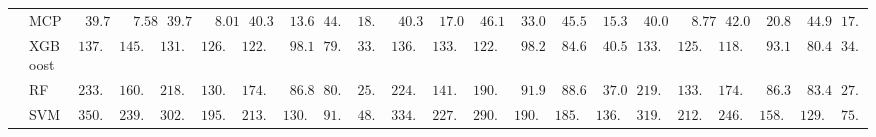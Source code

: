 \begin{tabular}{ll|ll|llllll|llllll|llllll}
 & MCP  & $\phantom{0}39.70$ & $\phantom{00}7.58$ & $\phantom{0}39.74$ & $\phantom{00}8.01$ & $\phantom{0}40.32$ & $\phantom{0}13.66$ & $44.95$ & $18.59$ & $\phantom{0}40.30$ & $\phantom{0}17.08$ & $\phantom{0}46.10$ & $\phantom{0}33.04$ & $\phantom{0}45.55$ & $\phantom{0}15.35$ & $\phantom{0}40.06$ & $\phantom{00}8.77$ & $\phantom{0}42.05$ & $\phantom{0}20.85$ & $\phantom{0}44.97$ & $17.36$ \\
 & XGBoost  & $137.63$ & $145.82$ & $131.73$ & $126.32$ & $122.86$ & $\phantom{0}98.16$ & $79.08$ & $33.90$ & $136.08$ & $133.86$ & $122.98$ & $\phantom{0}98.26$ & $\phantom{0}84.62$ & $\phantom{0}40.57$ & $133.47$ & $125.76$ & $118.80$ & $\phantom{0}93.19$ & $\phantom{0}80.47$ & $34.38$ \\
 & RF  & $233.18$ & $160.61$ & $218.74$ & $130.68$ & $174.17$ & $\phantom{0}86.89$ & $80.32$ & $25.93$ & $224.48$ & $141.31$ & $190.31$ & $\phantom{0}91.95$ & $\phantom{0}88.63$ & $\phantom{0}37.01$ & $219.19$ & $133.51$ & $174.98$ & $\phantom{0}86.34$ & $\phantom{0}83.42$ & $27.19$ \\
 & SVM  & $350.45$ & $239.66$ & $302.04$ & $195.60$ & $213.53$ & $130.27$ & $91.90$ & $48.03$ & $334.35$ & $227.12$ & $290.01$ & $190.51$ & $185.61$ & $136.70$ & $319.05$ & $212.95$ & $246.36$ & $158.61$ & $129.04$ & $75.72$ \\
\hline 
\end{tabular}

